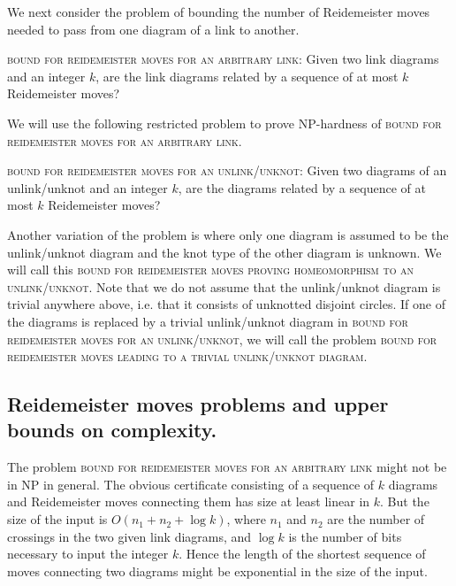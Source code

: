 \documentclass[12pt]{amsart}
\theoremstyle{definition}
\theoremstyle{remark}
\begin{document}
We next consider the problem of bounding the number of Reidemeister moves needed to pass from one diagram of a link to another.

\vspace{0.14in}
\textsc{bound for reidemeister moves for an arbitrary link}: Given two link diagrams and an integer $k$, are the link diagrams related by a sequence of at most $k$ Reidemeister moves?
\vspace{0.14in}


 We will use the following restricted problem to prove NP-hardness of \textsc{bound for reidemeister moves for an arbitrary link}.


\vspace{0.14in}
\textsc{bound for reidemeister moves for an unlink/unknot}: Given two diagrams of an unlink/unknot and an integer $k$, are the diagrams related by a sequence of at most $k$ Reidemeister moves?
\vspace{0.14in}

Another variation of the problem is where only one diagram is assumed to be the unlink/unknot diagram and the knot type of the other diagram is unknown.
We will call this \textsc{bound for reidemeister moves proving homeomorphism to an unlink/unknot}.
Note that we do not assume that the unlink/unknot diagram is trivial anywhere above, i.e.
that it consists of unknotted disjoint circles.
If one of the diagrams is replaced by a trivial unlink/unknot diagram in \textsc{bound for reidemeister moves for an unlink/unknot}, we will call the problem \textsc{bound for reidemeister moves leading to a trivial unlink/unknot diagram}.


\subsection{Reidemeister moves problems and upper bounds on complexity.}

The problem \textsc{bound for reidemeister moves for an arbitrary link} might not be in NP in general.
The obvious certificate consisting of a sequence of $k$ diagrams and Reidemeister moves connecting them has size at least linear in $k$.
But the size of the input is $O(n_1+n_2+\log k)$, where $n_1$ and $n_2$ are the number of crossings in the two given link diagrams, and $\log k$ is the number of bits necessary to input the integer $k$.
Hence the length of the shortest sequence of moves connecting two diagrams might be exponential in the size of the input.
\end{document}
